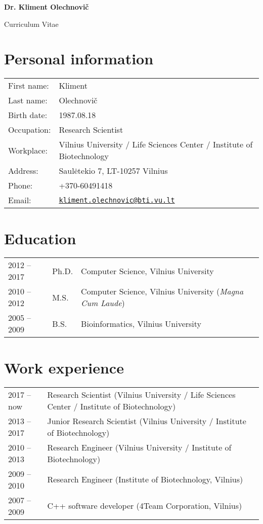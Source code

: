 \documentclass{article}
\def\name{Dr. Kliment Olechnovič}
\begin{document}
\onehalfspacing

\begin{center}
{\huge \bf \name}
\end{center}

\begin{center}
{\Large Curriculum Vitae}
\end{center}


\section*{Personal information}
\begin{tabular}{p{}p{}}
First name:          & Kliment\\
Last name:           & Olechnovič\\
Birth date:          & 1987.08.18 \\
Occupation:          & Research Scientist \\
Workplace:           & Vilnius University / Life Sciences Center / Institute of Biotechnology \\
Address:             & Saulėtekio 7, LT-10257 Vilnius \\
Phone:               & +370-60491418 \\
Email:               & \href{mailto:kliment.olechnovic@bti.vu.lt}{\tt kliment.olechnovic@bti.vu.lt} \\
\end{tabular}


\section*{Education}
\begin{tabular}{p{}p{}p{}}
2012 -- 2017 & Ph.D. & Computer Science, Vilnius University \\
2010 -- 2012 & M.S.  & Computer Science, Vilnius University (\emph{Magna Cum Laude}) \\
2005 -- 2009 & B.S.  & Bioinformatics, Vilnius University
\end{tabular}


\section*{Work experience}
\begin{tabular}{p{}p{}}
2017 -- now  & Research Scientist (Vilnius University / Life Sciences Center / Institute of Biotechnology)\\
2013 -- 2017 & Junior Research Scientist (Vilnius University / Institute of Biotechnology) \\
2010 -- 2013 & Research Engineer (Vilnius University / Institute of Biotechnology) \\
2009 -- 2010 & Research Engineer (Institute of Biotechnology, Vilnius) \\
2007 -- 2009 & C++ software developer (4Team Corporation, Vilnius)
\end{tabular}
\end{document}
